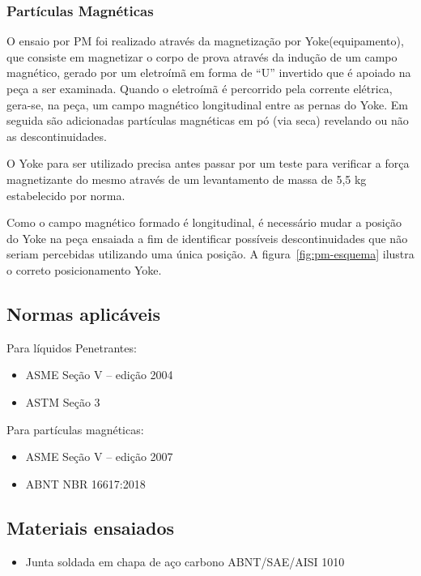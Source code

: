 \documentclass[12pt,oneside]{article}
\begin{document}
\subsubsection{Partículas Magnéticas}
O ensaio por PM foi realizado através da magnetização por Yoke(equipamento), que consiste em magnetizar
o corpo de prova através da indução de um campo magnético, gerado por um eletroímã em forma
de ``U'' invertido que é apoiado na peça a ser examinada. Quando o eletroímã é percorrido
pela corrente elétrica, gera-se, na peça, um campo magnético longitudinal entre as pernas do Yoke.
Em seguida são adicionadas partículas magnéticas em pó (via seca) revelando ou não as descontinuidades.

O Yoke para ser utilizado precisa antes passar por um teste para verificar a força magnetizante do mesmo
através de um levantamento de massa de 5,5 kg estabelecido por norma.

Como o campo magnético formado é longitudinal, é necessário mudar a posição do Yoke na peça
ensaiada a fim de identificar possíveis descontinuidades que não seriam percebidas
utilizando uma única posição. A figura~\ref{fig:pm-esquema} ilustra o correto posicionamento
Yoke.


\subsection{Normas aplicáveis}
Para líquidos Penetrantes:

\begin{itemize}
    \item ASME Seção V -- edição 2004
    \item ASTM Seção 3
\end{itemize}

Para partículas magnéticas:
\begin{itemize}
    \item ASME Seção V -- edição 2007
    \item ABNT NBR 16617:2018
\end{itemize}

\subsection{Materiais ensaiados}

\begin{itemize}
    \item Junta soldada em chapa de aço carbono ABNT/SAE/AISI 1010
\end{itemize}
\end{document}
